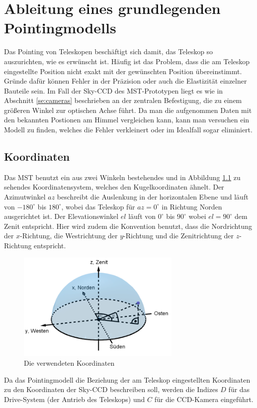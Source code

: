 \chapter{Ableitung eines grundlegenden Pointingmodells}
\label{ch:pointing}
Das Pointing von Teleskopen beschäftigt sich damit, das Teleskop so auszurichten, wie es erwünscht ist. Häufig ist das Problem, dass die am Teleskop eingestellte Position nicht exakt mit der gewünschten Position übereinstimmt. Gründe dafür können Fehler in der Präzision oder auch die Elastizität einzelner Bauteile sein. Im Fall der Sky-CCD des MST-Prototypen liegt es wie in Abschnitt \ref{se:cameras} beschrieben an der zentralen Befestigung, die zu einem größeren Winkel zur optischen Achse führt. Da man die aufgenommen Daten mit den bekannten Postionen am Himmel vergleichen kann, kann man versuchen ein Modell zu finden, welches die Fehler verkleinert oder im Idealfall sogar eliminiert.

\section{Koordinaten}
Das MST benutzt ein aus zwei Winkeln bestehendes und in Abbildung \ref{img:coordinates} zu sehendes Koordinatensystem, welches den Kugelkoordinaten ähnelt. Der Azimutwinkel $az$ beschreibt die Auslenkung in der horizontalen Ebene und läuft von $-180^{\circ}$ bis $180^{\circ}$, wobei das Teleskop für $az=0^{\circ}$ in Richtung Norden ausgerichtet ist. Der Elevationswinkel $el$ läuft von $0^{\circ}$ bis $90^{\circ}$ wobei $el=90^{\circ}$ dem Zenit entspricht. Hier wird zudem die Konvention benutzt, dass die Nordrichtung der $x$-Richtung, die Westrichtung der $y$-Richtung und die Zenitrichtung der $z$-Richtung entspricht.
\begin{figure}[htbp]
\centering
\includegraphics[width=0.7\textwidth]{Images/coordinates.png}
\caption{Die verwendeten Koordinaten}
\label{img:coordinates}
\end{figure}
Da das Pointingmodell die Beziehung der am Teleskop eingestellten Koordinaten zu den Koordinaten der Sky-CCD beschreiben soll, werden die Indizes $D$ für das Drive-System (der Antrieb des Teleskops) und $C$ für die CCD-Kamera eingeführt.

